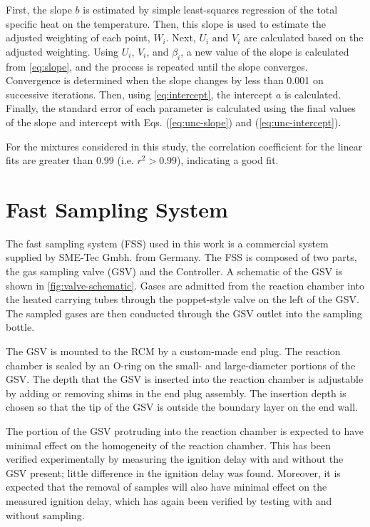\documentclass[12pt, letterpaper]{article}
\begin{document}
First, the slope $b$ is estimated by simple least-squares regression of the total
specific heat on the temperature. Then, this slope is used to estimate the
adjusted weighting of each point, $W_i$. Next, $U_i$ and $V_i$ are calculated
based on the adjusted weighting. Using $U_i$, $V_i$, and $\beta_i$, a new value of the
slope is calculated from \autoref{eq:slope}, and the process is repeated until the slope converges.
Convergence is determined when the slope changes by less than 0.001 on successive
iterations. Then, using \autoref{eq:intercept}, the intercept $a$ is calculated.
Finally, the standard error of each parameter is
calculated using the final values of the slope and intercept with Eqs. (\ref{eq:unc-slope})
and (\ref{eq:unc-intercept}).

For the mixtures considered in
this study, the correlation coefficient for the linear fits are greater than
0.99 (i.e. $r^2 > 0.99$), indicating a good fit.

\section{Fast Sampling System}
\label{sec:fast-sampling}

The fast sampling system (FSS) used in this work is a commercial system supplied by
SME-Tec Gmbh. from Germany. The FSS is composed of two parts, the gas sampling valve
(GSV) and the Controller. A schematic of the GSV is shown in \autoref{fig:valve-schematic}.
Gases are admitted from the reaction chamber into the heated carrying tubes
through the poppet-style valve on the left of the GSV. The sampled gases are then
conducted through the GSV outlet into the sampling bottle.

The GSV is mounted to the RCM by a custom-made end plug. The reaction chamber
is sealed by an O-ring on the small- and large-diameter portions of the GSV.
The depth that the GSV is inserted into the reaction chamber is adjustable
by adding or removing shims in the end plug assembly. The insertion depth
is chosen so that the tip of the GSV is outside the boundary layer on the
end wall.

The portion of the GSV protruding into the reaction chamber is expected
to have minimal effect on the homogeneity of the reaction chamber. This
has been verified experimentally by measuring the ignition delay with
and without the GSV present; little difference in the ignition delay was
found. Moreover, it is expected that the removal of samples will also
have minimal effect on the measured ignition delay, which has again
been verified by testing with and without sampling.
\end{document}
